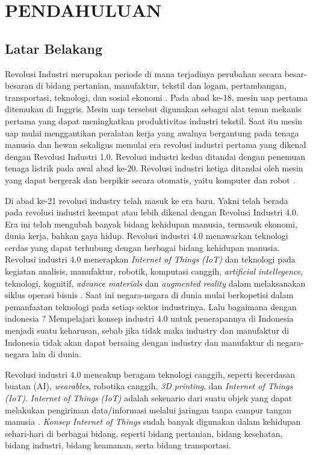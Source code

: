 \chapter{PENDAHULUAN}

\section{Latar Belakang}
Revolusi Industri merupakan periode di mana terjadinya perubahan secara besar-besaran di bidang pertanian, manufaktur, tekstil dan logam, pertambangan, transportasi, teknologi, dan sosial ekonomi . Pada abad ke-18, mesin uap pertama ditemukan di Inggris. Mesin uap tersebut digunakan sebagai alat tenun mekanis pertama yang dapat meningkatkan produktivitas industri tekstil. Saat itu mesin uap mulai menggantikan peralatan kerja yang awalnya bergantung pada tenaga manusia dan hewan sekaligus memulai era revolusi industri pertama yang dikenal dengan Revolusi Industri 1.0. Revolusi industri kedua ditandai dengan penemuan tenaga listrik pada awal abad ke-20. Revolusi industri ketiga ditandai oleh mesin yang dapat bergerak dan berpikir secara otomatis, yaitu komputer dan robot . 

Di abad ke-21 revolusi industry telah masuk ke era baru. Yakni telah berada pada revolusi industri keempat atau lebih dikenal dengan Revolusi Industri 4.0. Era ini telah mengubah banyak bidang kehidupan manusia, termasuk ekonomi, dunia kerja, bahkan gaya hidup. Revolusi industri 4.0 menawarkan teknologi cerdas yang dapat terhubung dengan berbagai bidang kehidupan manusia. Revolusi industri 4.0 menerapkan \textit{Internet of Things} \textit{(IoT)} dan teknologi pada kegiatan analisis, manufaktur, robotik, komputasi canggih, \textit{artificial intellegence}, teknologi, kognitif, \textit{advance materials} dan \textit{augmented reality} dalam melaksanakan siklus operasi bisnis . Saat ini negara-negara di dunia mulai berkopetisi dalam pemanfaatan teknologi pada setiap sektor industrinya. Lalu bagaimana dengan indonesia ? Mempelajari konsep industri 4.0 untuk penerapannya di Indonesia menjadi suatu keharusan, sebab jika tidak maka industry dan manufaktur di Indonesia tidak akan dapat bersaing dengan industry dan manufaktur di negara-negara lain di dunia.

Revolusi industri 4.0 mencakup beragam teknologi canggih, seperti kecerdasan buatan (AI), \textit{wearables}, robotika canggih, \textit{3D printing}, dan \textit{Internet of Things} \textit{(IoT)}. \textit{Internet of Things} \textit{(IoT)} adalah sekenario dari suatu objek yang dapat melakukan pengiriman data/informasi melalui jaringan tanpa campur tangan manusia . \textit{Konsep Internet of Things} sudah banyak digunakan dalam kehidupan sehari-hari di berbagai bidang, seperti bidang pertanian, bidang kesehatan, bidang industri, bidang keamanan, serta bidang transportasi.

